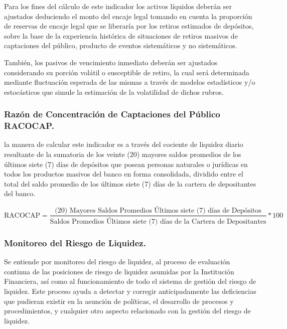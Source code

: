 \documentclass[10pt,]{article}
\begin{document}
Para los fines del cálculo de este indicador los activos líquidos
deberán ser ajustados deduciendo el monto del encaje legal tomando en
cuenta la proporción de reservas de encaje legal que se liberaría por
los retiros estimados de depósitos, sobre la base de la experiencia
histórica de situaciones de retiros masivos de captaciones del público,
producto de eventos sistemáticos y no sistemáticos.

También, los pasivos de vencimiento inmediato deberán ser ajustados
considerando su porción volátil o susceptible de retiro, la cual será
determinada mediante fluctuación esperada de las mismas a través de
modelos estadísticos y/o estocásticos que simule la estimación de la
volatilidad de dichos rubros.

\hypertarget{razon-de-concentracion-de-captaciones-del-publico-racocap.}{%
\subsubsection{\texorpdfstring{\textbf{Razón de Concentración de
Captaciones del Público}
RACOCAP.}{Razón de Concentración de Captaciones del Público RACOCAP.}}\label{razon-de-concentracion-de-captaciones-del-publico-racocap.}}

la manera de calcular este indicador es a través del cociente de
liquidez diario resultante de la sumatoria de los veinte (20) mayores
saldos promedios de los últimos siete (7) días de depósitos que posean
personas naturales o jurídicas en todos los productos masivos del banco
en forma consolidada, dividido entre el total del saldo promedio de los
últimos siete (7) días de la cartera de depositantes del banco.

\[\text{RACOCAP} = \frac{\text{(20) Mayores Saldos Promedios Últimos siete (7) días de Depósitos}}{\text{Saldos Promedios Últimos siete (7) días de la Cartera de Depositantes}}*100\]

\hypertarget{monitoreo-del-riesgo-de-liquidez.}{%
\subsubsection{Monitoreo del Riesgo de
Liquidez.}\label{monitoreo-del-riesgo-de-liquidez.}}

Se entiende por monitoreo del riesgo de liquidez, al proceso de
evaluación continua de las posiciones de riesgo de liquidez asumidas por
la Institución Financiera, así como al funcionamiento de todo el sistema
de gestión del riesgo de liquidez. Este proceso ayuda a detectar y
corregir anticipadamente las deficiencias que pudieran existir en la
asunción de políticas, el desarrollo de procesos y procedimientos, y
cualquier otro aspecto relacionado con la gestión del riesgo de
liquidez.
\end{document}

